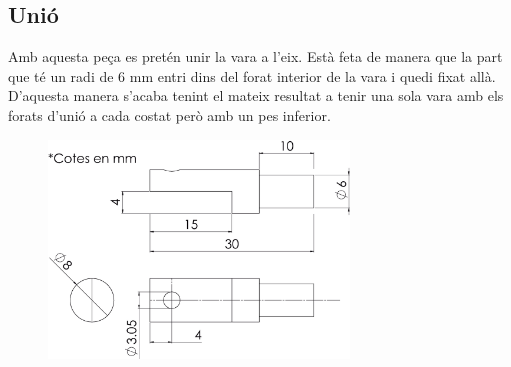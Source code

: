 \documentclass[a4paper, 12pt]{article}
\begin{document}
\subsection{Unió}
Amb aquesta peça es pretén unir la vara a l'eix. Està feta de manera que la part que té un radi de 6 mm entri dins del forat interior de la vara i quedi fixat allà. D'aquesta manera s'acaba tenint el mateix resultat a tenir una sola vara amb els forats d'unió a cada costat però amb un pes inferior.
\begin{figure}[h!]
\centering
\includegraphics[width=8cm]{./sketch/unio}
\end{figure}


\newpage
\end{document}
